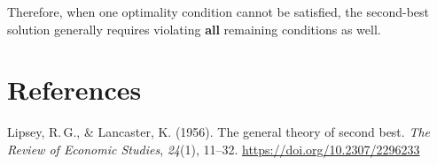 \documentclass[11pt]{article}
\begin{document}
Therefore, when one optimality condition cannot be satisfied, the second-best solution generally requires violating \textbf{all} remaining conditions as well.

\section*{References}

\noindent Lipsey, R.\,G., \& Lancaster, K. (1956). The general theory of second best. \textit{The Review of Economic Studies}, \textit{24}(1), 11--32. \url{https://doi.org/10.2307/2296233}
\end{document}
